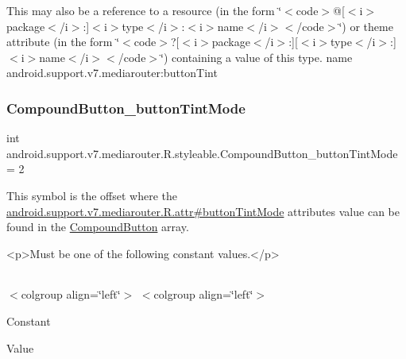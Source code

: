 This may also be a reference to a resource (in the form \char`\"{}$<$code$>$@\mbox{[}$<$i$>$package$<$/i$>$\+:\mbox{]}$<$i$>$type$<$/i$>$\+:$<$i$>$name$<$/i$>$$<$/code$>$\char`\"{}) or theme attribute (in the form \char`\"{}$<$code$>$?\mbox{[}$<$i$>$package$<$/i$>$\+:\mbox{]}\mbox{[}$<$i$>$type$<$/i$>$\+:\mbox{]}$<$i$>$name$<$/i$>$$<$/code$>$\char`\"{}) containing a value of this type.  name android.\+support.\+v7.\+mediarouter\+:button\+Tint \mbox{\label{classandroid_1_1support_1_1v7_1_1mediarouter_1_1R_1_1styleable_aa96c6cd2513f203fc183a5d197e18721}} 
\subsubsection{\texorpdfstring{Compound\+Button\+\_\+button\+Tint\+Mode}{CompoundButton\_buttonTintMode}}
{\footnotesize\ttfamily int android.\+support.\+v7.\+mediarouter.\+R.\+styleable.\+Compound\+Button\+\_\+button\+Tint\+Mode = 2\hspace{0.3cm}{\ttfamily [static]}}

This symbol is the offset where the \hyperlink{classandroid_1_1support_1_1v7_1_1mediarouter_1_1R_1_1attr_a329e426e78f4dea5ee1c3caca9bd8629}{android.\+support.\+v7.\+mediarouter.\+R.\+attr\#button\+Tint\+Mode} attribute\textquotesingle{}s value can be found in the \hyperlink{classandroid_1_1support_1_1v7_1_1mediarouter_1_1R_1_1styleable_a9eda6207848fcda69affb749b57b23b9}{Compound\+Button} array.

\begin{DoxyVerb}      <p>Must be one of the following constant values.</p>
\end{DoxyVerb}
 \tabulinesep=1mm
\begin{longtabu} spread 0pt [c]{*{0}{|X[-1]}|}
\hline
\end{longtabu}
$<$colgroup align=\char`\"{}left\char`\"{}$>$ $<$colgroup align=\char`\"{}left\char`\"{}$>$ 

Constant

Value

